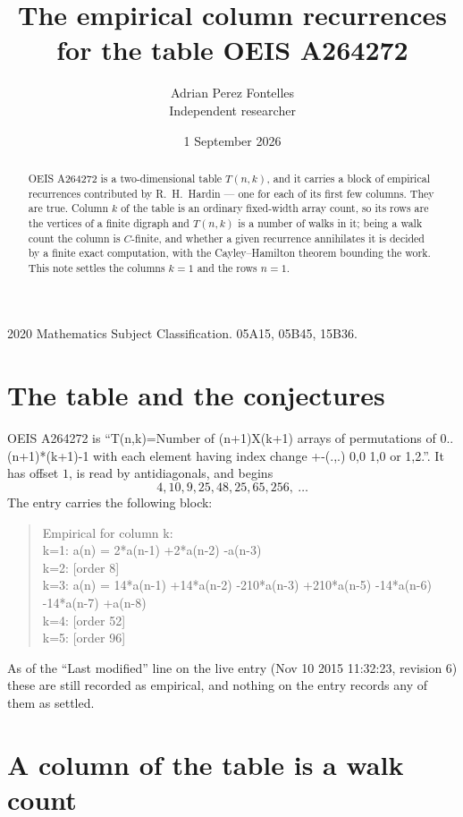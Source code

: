 \documentclass[11pt,a4paper]{article}
\title{The empirical column recurrences for the table OEIS A264272}
\author{Adrian Perez Fontelles\\ \small Independent researcher}
\date{1 September 2026}
\theoremstyle{plain}
\theoremstyle{definition}
\begin{document}
\maketitle

\begin{abstract}
OEIS A264272 is a two-dimensional table $T(n,k)$, and it carries a block of empirical
recurrences contributed by R.~H.~Hardin --- one for each of its first few columns. They are
true. Column $k$ of the table is an ordinary fixed-width array count, so its rows are the
vertices of a finite digraph and $T(n,k)$ is a number of walks in it; being a walk count the
column is $C$-finite, and whether a given recurrence annihilates it is decided by a finite
exact computation, with the Cayley--Hamilton theorem bounding the work. This note settles the columns $k=1$ and the rows $n=1$.
\end{abstract}

\noindent\small 2020 Mathematics Subject Classification. 05A15, 05B45, 15B36.\normalsize

\section{The table and the conjectures}

OEIS A264272 is ``T(n,k)=Number of (n+1)X(k+1) arrays of permutations of 0..(n+1)*(k+1)-1 with each element having index change +-(.,.) 0,0 1,0 or 1,2.''. It has offset $1$, is
read by antidiagonals, and begins
\[
4, 10, 9, 25, 48, 25, 65, 256,\ \dots
\]
The entry carries the following block:
\begin{quote}\small
Empirical for column k:\\
k=1: a(n) = 2*a(n-1) +2*a(n-2) -a(n-3)\\
k=2: [order 8]\\
k=3: a(n) = 14*a(n-1) +14*a(n-2) -210*a(n-3) +210*a(n-5) -14*a(n-6) -14*a(n-7) +a(n-8)\\
k=4: [order 52]\\
k=5: [order 96]\\
\end{quote}
As of the ``Last modified'' line on the live entry (Nov 10 2015 11:32:23, revision 6) these are still
recorded as empirical, and nothing on the entry records any of them as settled.

\section{A column of the table is a walk count}
\end{document}

